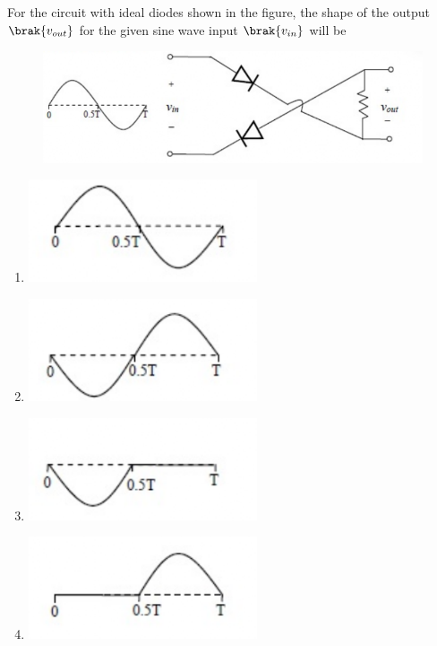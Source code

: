     \hfill{}

    \item For the circuit with ideal diodes shown in the figure, the shape of the output $\brak{v_{out}}$ for the given sine wave input $\brak{v_{in}}$ will be
    \begin{figure}[H]
        \centering
        \includegraphics[width=0.5\columnwidth]{figs/q21.png}
        \caption*{}
        \label{fig:q21}
    \end{figure}
    \begin{enumerate}
        \item \includegraphics[width=0.4\columnwidth]{figs/q21A.png}
        \item \includegraphics[width=0.4\columnwidth]{figs/q21B.png}
        \item \includegraphics[width=0.4\columnwidth]{figs/q21C.png}
        \item \includegraphics[width=0.4\columnwidth]{figs/q21D.png}
    \end{enumerate}
    
    \hfill{}

